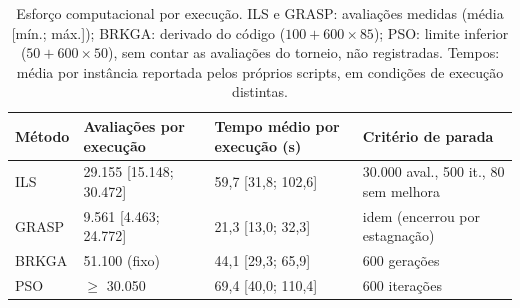 \begin{table}[t]
\centering
\caption{Esforço computacional por execução. ILS e GRASP: avaliações medidas (média [mín.; máx.]); BRKGA: derivado do código ($100+600\times85$); PSO: limite inferior ($50+600\times50$), sem contar as avaliações do torneio, não registradas. Tempos: média por instância reportada pelos próprios scripts, em condições de execução distintas.}
\label{tab:effort}
\footnotesize
\begin{tabular}{@{}llll@{}}
\toprule
Método & Avaliações por execução & Tempo médio por execução (s) & Critério de parada \\
\midrule
ILS & 29.155 [15.148; 30.472] & 59,7 [31,8; 102,6] & 30.000 aval., 500 it., 80 sem melhora \\
GRASP & 9.561 [4.463; 24.772] & 21,3 [13,0; 32,3] & idem (encerrou por estagnação) \\
BRKGA & 51.100 (fixo) & 44,1 [29,3; 65,9] & 600 gerações \\
PSO & $\geq$ 30.050 & 69,4 [40,0; 110,4] & 600 iterações \\
\bottomrule
\end{tabular}
\end{table}
